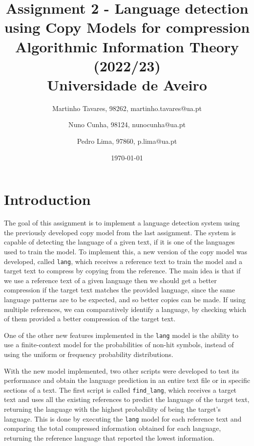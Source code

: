 \documentclass{article}
\begin{document}
\title{
    Assignment 2 - Language detection using Copy Models for compression \\
    \large{Algorithmic Information Theory (2022/23) \\
    Universidade de Aveiro}
}

\author{
    Martinho Tavares, 98262, martinho.tavares@ua.pt \and
    Nuno Cunha, 98124, nunocunha@ua.pt \and
    Pedro Lima, 97860, p.lima@ua.pt
}

\date{\today}
\maketitle

\section{Introduction}
\label{sec:introduction}

The goal of this assignment is to implement a language detection system using the previously developed copy model from the last assignment.
The system is capable of detecting the language of a given text, if it is one of the languages used to train the model.
To implement this, a new version of the copy model was developed, called \texttt{lang}, which receives a reference text to train the model and a target text to compress by copying from the reference.
The main idea is that if we use a reference text of a given language then we should get a better compression if the target text matches the provided language, since the same language patterns are to be expected, and so better copies can be made.
If using multiple references, we can comparatively identify a language, by checking which of them provided a better compression of the target text.

One of the other new features implemented in the \texttt{lang} model is the ability to use a finite-context model for the probabilities of non-hit symbols, instead of using the uniform or frequency probability distributions.

With the new model implemented, two other scripts were developed to test its performance and obtain the language prediction in an entire text file or in specific sections of a text.
The first script is called \texttt{find\_lang}, which receives a target text and uses all the existing references to predict the language of the target text, returning the language with the highest probability of being the target's language.
This is done by executing the \texttt{lang} model for each reference text and comparing the total compressed information obtained for each language, returning the reference language that reported the lowest information.
\end{document}
